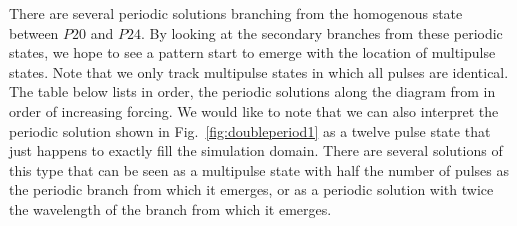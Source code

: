\documentclass[api,pof,pre,12pt,a4paper]{revtex4-1}
\begin{document}
There are several periodic solutions branching from the homogenous state between $P20$ and $P24$.  By looking at the secondary branches from these periodic states, we hope to see a pattern start to emerge with the location of multipulse states.  Note that we only track multipulse states in which all pulses are identical.  The table below lists in order, the periodic solutions along the diagram from in order of increasing forcing.  We would like to note that we can also interpret the periodic solution shown in Fig.~\ref{fig:doubleperiod1} as a twelve pulse state that just happens to exactly fill the simulation domain.  There are several solutions of this type that can be seen as a multipulse state with half the number of pulses as the periodic branch from which it emerges, or as a periodic solution with twice the wavelength of the branch from which it emerges.  

\end{document}
